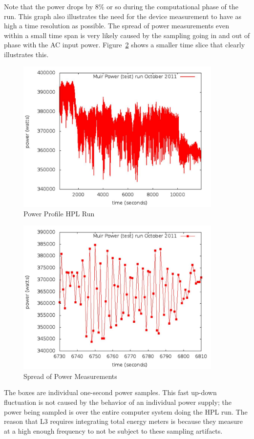\noindent
Note that the power drops by 8\% or so during the computational phase of the run.  This graph also illustrates the need for the device measurement to have as high a time resolution as possible.  The spread of power measurements even within a small time span is very likely caused by the sampling going in and out of phase with the AC input power. Figure~\ref{fig:sopm} shows a smaller time slice that clearly illustrates this.
\wl


\begin{figure}
\centering
\includegraphics[width=4in]{fig3-1}
\caption{Power Profile HPL Run}
\label{fig:powprof}
\end{figure}

\begin{figure}
\centering
\includegraphics[width=4in]{fig3-2}
\caption{Spread of Power Measurements}
\label{fig:sopm}
\end{figure}

\noindent
The boxes are individual one-second power samples.  This fast up-down fluctuation is not caused by the behavior of an individual power supply; the power being sampled is over the entire computer system doing the HPL run.  The reason that L3 requires integrating total energy meters is because they measure at a high enough frequency to not be subject to these sampling artifacts.
\wl

